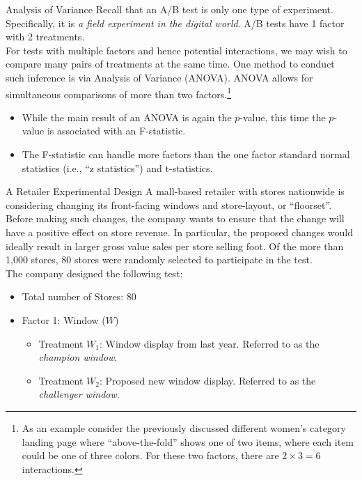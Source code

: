 \documentclass[pdf]{beamer}
\theoremstyle{remark}
\theoremstyle{definition}
\begin{document}
\begin{frame}[t]{Analysis of Variance}
Recall that an A/B test is only one type of experiment.  Specifically, it is  \textit{a field experiment in the digital world}. A/B tests have 1 factor with 2 treatments. \\
\vspace{1.5ex}
For tests with multiple factors and hence potential interactions, we may wish to compare many pairs of treatments at the same time.  One method to conduct such inference is via Analysis of Variance (ANOVA). ANOVA allows for simultaneous comparisons of more than two factors.\footnote{As an example consider the previously discussed different women's category landing page where ``above-the-fold'' shows one of two items, where each item could be one of three colors.  For these two factors, there are $2 \times 3 = 6$  interactions.}\\
\vspace{0.0ex}
\small
\begin{itemize}
\item While the main result of an ANOVA is again the $p$-value, this time the $p$-value is associated with an F-statistic.  
\item The F-statistic can handle more factors than the one factor standard normal statistics (i.e., ``z statistics'') and t-statistics. 
\end{itemize}
\end{frame}

\begin{frame}[t]{A Retailer Experimental Design}
A mall-based retailer with stores nationwide is considering changing its front-facing windows and store-layout, or ``floorset''.  Before making such changes, the company wants to ensure that the change will have a positive effect on store revenue.  In particular, the proposed changes would ideally result in larger gross value sales per store selling foot. Of the more than 1,000 stores, 80 stores were randomly selected to participate in the test. \\
\vspace{1.5ex}
The company designed the following test: 
\begin{itemize}
\item Total number of Stores:  80
\item Factor 1:  Window ($W$)
\small
  \begin{itemize}
  \item Treatment $W_1$:  Window display from last year.  Referred to as the \textit{champion window}.
  \item Treatment $W_2$:  Proposed new window display.  Referred to as the \textit{challenger window}.
\end{itemize}
\end{itemize}
\end{frame}
\end{document}
